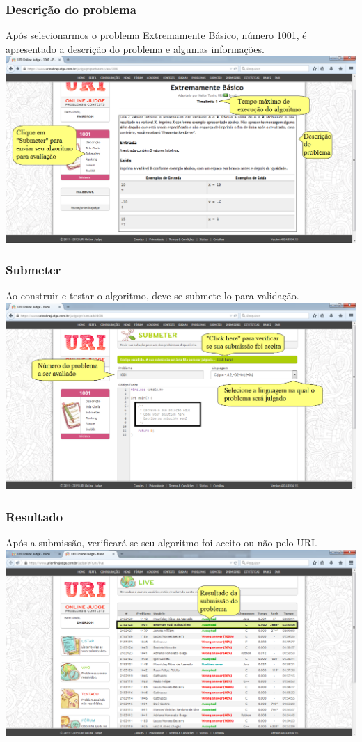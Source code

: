 \begin{frame}
 \frametitle{Descrição do problema}
 Após selecionarmos o problema Extremamente Básico, número 1001,
 é apresentado a descrição do problema e algumas informações.
 \includegraphics[scale=.28]{uri/Imagens/07DescricaoProblema.png}
\end{frame}

\begin{frame}
 \frametitle{Submeter}
 Ao construir e testar o algoritmo, deve-se submete-lo para validação.
 \includegraphics[scale=.28]{uri/Imagens/08Submeter.png}
\end{frame}

\begin{frame}
 \frametitle{Resultado}
 Após a submissão, verificará se seu algoritmo foi aceito ou não pelo URI.
 \includegraphics[scale=.28]{uri/Imagens/09Resultado.png}
\end{frame}